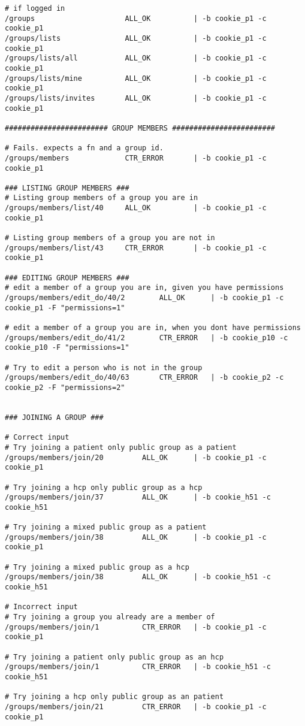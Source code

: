 \begin{verbatim}
# if logged in 
/groups						ALL_OK			| -b cookie_p1 -c cookie_p1
/groups/lists				ALL_OK			| -b cookie_p1 -c cookie_p1
/groups/lists/all			ALL_OK			| -b cookie_p1 -c cookie_p1
/groups/lists/mine			ALL_OK			| -b cookie_p1 -c cookie_p1
/groups/lists/invites		ALL_OK			| -b cookie_p1 -c cookie_p1

######################## GROUP MEMBERS ########################

# Fails. expects a fn and a group id. 
/groups/members				CTR_ERROR		| -b cookie_p1 -c cookie_p1 

### LISTING GROUP MEMBERS ###
# Listing group members of a group you are in
/groups/members/list/40		ALL_OK			| -b cookie_p1 -c cookie_p1

# Listing group members of a group you are not in
/groups/members/list/43		CTR_ERROR		| -b cookie_p1 -c cookie_p1

### EDITING GROUP MEMBERS ###
# edit a member of a group you are in, given you have permissions
/groups/members/edit_do/40/2		ALL_OK		| -b cookie_p1 -c cookie_p1 -F "permissions=1"

# edit a member of a group you are in, when you dont have permissions 
/groups/members/edit_do/41/2		CTR_ERROR	| -b cookie_p10 -c cookie_p10 -F "permissions=1"

# Try to edit a person who is not in the group
/groups/members/edit_do/40/63		CTR_ERROR	| -b cookie_p2 -c cookie_p2 -F "permissions=2"


### JOINING A GROUP ###

# Correct input
# Try joining a patient only public group as a patient
/groups/members/join/20			ALL_OK		| -b cookie_p1 -c cookie_p1

# Try joining a hcp only public group as a hcp
/groups/members/join/37			ALL_OK		| -b cookie_h51 -c cookie_h51

# Try joining a mixed public group as a patient 
/groups/members/join/38			ALL_OK		| -b cookie_p1 -c cookie_p1

# Try joining a mixed public group as a hcp
/groups/members/join/38			ALL_OK		| -b cookie_h51 -c cookie_h51

# Incorrect input
# Try joining a group you already are a member of
/groups/members/join/1			CTR_ERROR	| -b cookie_p1 -c cookie_p1

# Try joining a patient only public group as an hcp 
/groups/members/join/1			CTR_ERROR	| -b cookie_h51 -c cookie_h51

# Try joining a hcp only public group as an patient 
/groups/members/join/21			CTR_ERROR	| -b cookie_p1 -c cookie_p1


\end{verbatim}

